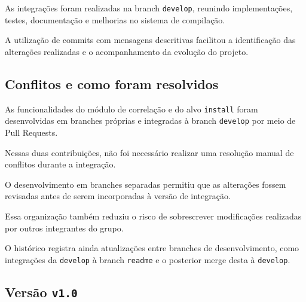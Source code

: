 \documentclass[12pt,a4paper]{article}
\newcommand{\todo}[1]{}
\newcommand{\cod}[1]{\texttt{#1}}
\begin{document}
As integrações foram realizadas na branch
\cod{develop}, reunindo implementações, testes,
documentação e melhorias no sistema de compilação.

A utilização de commits com mensagens descritivas
facilitou a identificação das alterações realizadas
e o acompanhamento da evolução do projeto.

\subsection{Conflitos e como foram resolvidos}

As funcionalidades do módulo de correlação e do alvo
\cod{install} foram desenvolvidas em branches próprias
e integradas à branch \cod{develop} por meio de
Pull Requests.

Nessas duas contribuições, não foi necessário
realizar uma resolução manual de conflitos durante
a integração.

O desenvolvimento em branches separadas permitiu
que as alterações fossem revisadas antes de serem
incorporadas à versão de integração.

Essa organização também reduziu o risco de
sobrescrever modificações realizadas por outros
integrantes do grupo.

O histórico registra ainda atualizações entre
branches de desenvolvimento, como integrações da
\cod{develop} à branch \cod{readme} e o posterior
merge desta à \cod{develop}.

\subsection{Versão \cod{v1.0}}
\todo{tag, data e hash do commit}

\end{document}
